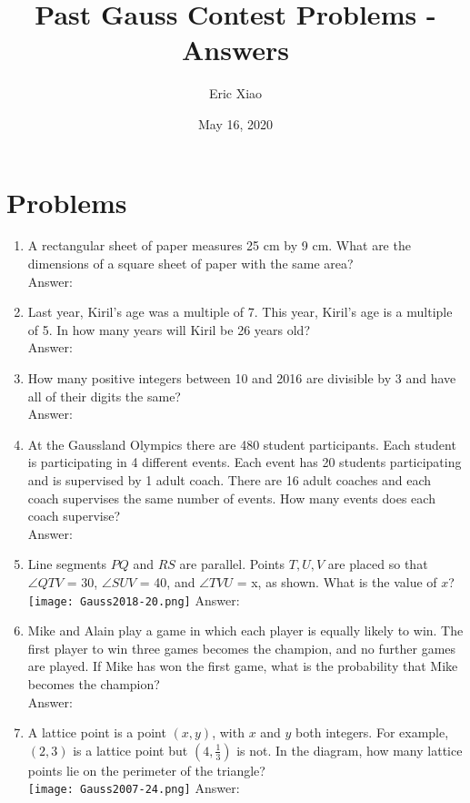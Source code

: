 \documentclass[12pt]{extarticle}
\title{Past Gauss Contest Problems - Answers}
\author{Eric Xiao}
\date{May 16, 2020}
\begin{document}
\maketitle

\section{Problems}
\begin{enumerate}
    \item {A rectangular sheet of paper measures 25 cm by 9 cm. What are the dimensions of a square sheet of paper with the same area? \\Answer: }
    \item {Last year, Kiril's age was a multiple of 7. This year, Kiril's age is a multiple of 5. In how many years will Kiril be 26 years old? \\Answer: }
    \item {How many positive integers between 10 and 2016 are divisible by 3 and have all of their digits the same? \\Answer: }
    \item {At the Gaussland Olympics there are 480 student participants. Each student is participating in 4 different events. Each event has 20 students participating and is supervised by 1 adult coach. There are 16 adult coaches and each coach supervises the same number of events. How many events does each coach supervise? \\Answer: }
    \item {Line segments $PQ$ and $RS$ are parallel. Points $T, U, V$ are placed so that $\angle QTV$ = 30\textdegree, $\angle SUV$ = 40\textdegree, and $\angle TVU$ = x\textdegree, as shown. What is the value of $x$?
    \\ \texttt{[image: Gauss2018-20.png]} Answer: }
    \item {Mike and Alain play a game in which each player is equally likely to win. The first player to win three games becomes the champion, and no further games are played. If Mike has won the first game, what is the probability that Mike becomes the champion? \\Answer: }
    \item {A lattice point is a point $(x, y)$, with $x$ and $y$ both integers. For example, $(2, 3)$ is a lattice point but $(4, \frac{1}{3})$ is not. In the diagram, how many lattice points lie on the perimeter of the triangle?
    \\ \texttt{[image: Gauss2007-24.png]} Answer: }

\end{enumerate}
\end{document}
